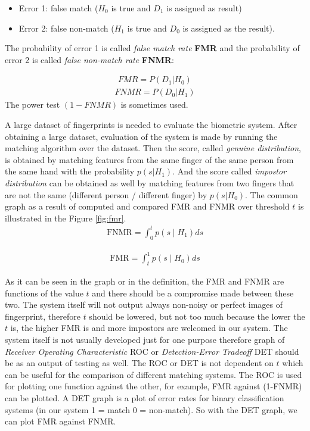\begin{itemize}[label={}]
    \item Error 1: false match ($H_0$ is true and $D_1$ is assigned as result)
    \item Error 2: false non-match ($H_1$ is true and $D_0$ is assigned as the result).
\end{itemize}

The probability of error 1 is called \emph{false match rate} \textbf{FMR} and the probability  of error 2 is called \emph{false non-match rate} \textbf{FNMR}: \cite{maltoni2009handbook}

\begin{align}
    FMR = P(D_1 | H_0 )
\end{align}
\begin{align}
    FNMR = P(D_0 | H_1 )
\end{align}
The power test $(1 - FNMR)$ is sometimes used. \cite{maltoni2009handbook}

A large dataset of fingerprints is needed to evaluate the biometric system. After obtaining a large dataset, evaluation of the system is made by running the matching algorithm over the dataset. Then the score, called \emph{genuine distribution}, is obtained by matching features from the same finger of the same person from the same hand with the probability  $p (s | H_1)$. And the score called \emph{impostor distribution} can be obtained as well by matching features from two fingers that are not the same (different person / different finger) by $p (s | H_0)$. The common graph as a result of computed and compared FMR and FNMR over threshold $t$ is illustrated in the Figure \ref{fig:fmr}.  \cite{maltoni2009handbook} \cite{fnmr_1}
\begin{align}
    \mathrm{FNMR}=\int_{0}^{t} p\left(s \mid H_{1}\right) ds
\end{align}
    
\begin{align}
    \mathrm{FMR}=\int_{t}^{1} p\left(s \mid H_{0}\right) ds
\end{align}

As it can be seen in the graph or in the definition, the FMR and FNMR are functions of the value $t$ and there should be a compromise made between these two. The system itself will not output always non-noisy or perfect images of fingerprint, therefore $t$ should be lowered, but not too much because the lower the $t$ is, the higher FMR is and more impostors are welcomed in our system. The system itself is not usually developed just for one purpose therefore graph of \emph{Receiver Operating Characteristic} ROC or \emph{Detection-Error Tradeoff} DET should be as an output of testing as well. The ROC or DET is not dependent on $t$ which can be useful for the comparison of different matching systems. The ROC is used for plotting one function against the other, for example, FMR against (1-FNMR) can be plotted. A DET graph is a plot of error rates for binary classification systems (in our system 1 = match 0 = non-match). So with the DET graph, we can plot FMR against FNMR. \cite{maltoni2009handbook}

